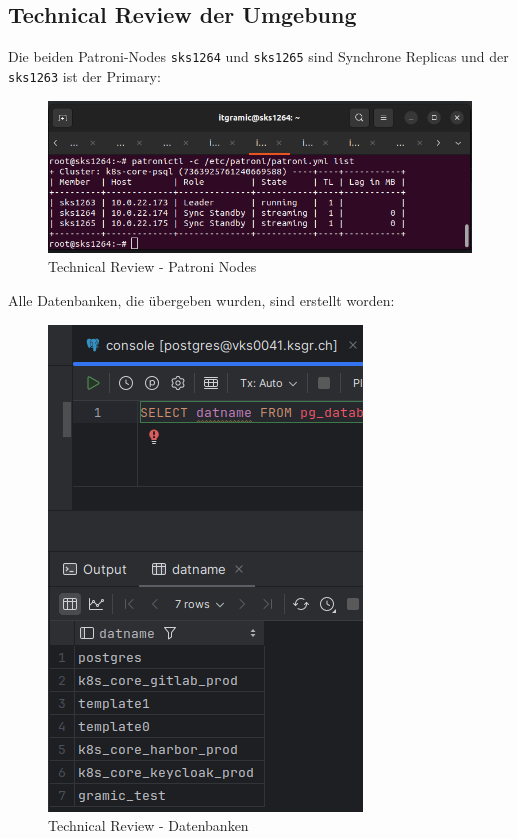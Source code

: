 
\begin{flushleft}
    \subsection{Technical Review der Umgebung}
    Die beiden Patroni-Nodes \texttt{sks1264} und \texttt{sks1265} sind Synchrone Replicas und der \texttt{sks1263} ist der Primary:
    \begin{figure}[H]
        \centering
        \includegraphics[width=1\linewidth]{source/implementation/construction_implementation/technical_review/patroni_list}
        \caption{Technical Review - Patroni Nodes}
        \label{fig:patroni_list}
    \end{figure}
\end{flushleft}
\begin{flushleft}
    Alle Datenbanken, die übergeben wurden, sind erstellt worden:
    \begin{figure}[H]
        \centering
        \includegraphics[width=0.5\linewidth]{source/implementation/construction_implementation/technical_review/datenbanken}
        \caption{Technical Review - Datenbanken}
        \label{fig:datenbanken}
    \end{figure}
\end{flushleft}
